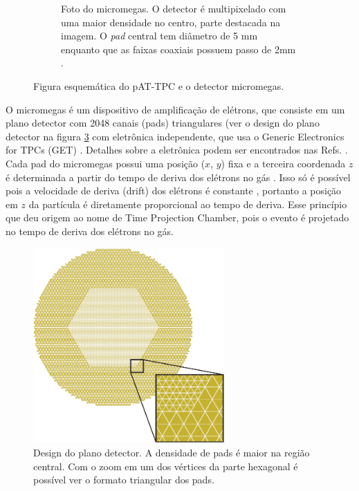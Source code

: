 \documentclass[a4paper,12pt,oneside]{book}
\begin{document}
\begin{figure}[H]
\begin{subfigure}[t]{0.49\textwidth}
        \caption{Foto do micromegas. O detector é multipixelado com uma maior densidade no centro, parte destacada na imagem. O \textit{pad} central tem diâmetro de 5 mm enquanto que as faixas coaxiais possuem passo de 2mm \cite{attpc, josh_bradt}.}
        \label{subfig:micromegas} 
    \end{subfigure}
\caption{Figura esquemática do pAT-TPC e o detector micromegas\cite{pattpc}.}
\label{fig:pattpc_e_micromegas}
\end{figure}

\par O micromegas é um dispositivo de amplificação de elétrons, que consiste em um plano detector com 2048 canais (pads) triangulares (ver o design do plano detector na figura \ref{fig:padplane} com eletrônica independente, que usa o Generic Electronics for TPCs (GET) \cite{GET}. Detalhes sobre a eletrônica podem ser encontrados nas Refs. \cite{GET, josh_bradt}. Cada pad do micromegas possui uma posição ($x$, $y$) fixa e a terceira coordenada $z$ é determinada a partir do tempo de deriva dos elétrons no gás \cite{pattpc, pattpc2, attpc, josh_bradt}. Isso só é possível pois a velocidade de deriva (drift) dos elétrons é constante \cite{drift_constant}, portanto a posição em $z$ da partícula é diretamente proporcional ao tempo de deriva. Esse princípio que deu origem ao nome de Time Projection Chamber, pois o evento é projetado no tempo de deriva dos elétrons no gás.

\begin{figure}[H]
    \centering
    \includegraphics[width=0.65\textwidth]{figs/padplane.png}
    \caption{Design do plano detector. A densidade de pads é maior na região central. Com o zoom em um dos vértices da parte hexagonal é possível ver o formato triangular dos pads.}
    \label{fig:padplane}
\end{figure}
\end{document}
